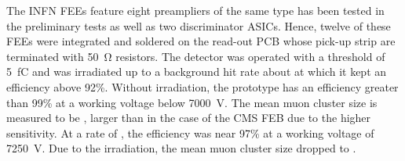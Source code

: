 	The INFN FEEs feature eight preampliers of the same type has been tested in the preliminary tests as well as two discriminator ASICs. Hence, twelve of these FEEs were integrated and soldered on the read-out PCB whose pick-up strip are terminated with \SI{50}{\ohm} resistors. The detector was operated with a threshold of \SI{5}{fC} and was irradiated up to a background hit rate about  at which it kept an efficiency above 92\%. Without irradiation, the prototype has an efficiency greater than 99\% at a working voltage below \SI{7000}{V}. The mean muon cluster size is measured to be , larger than in the case of the CMS FEB due to the higher sensitivity. At a rate of , the efficiency was near 97\% at a working voltage of \SI{7250}{V}. Due to the irradiation, the mean muon cluster size dropped to .
	
